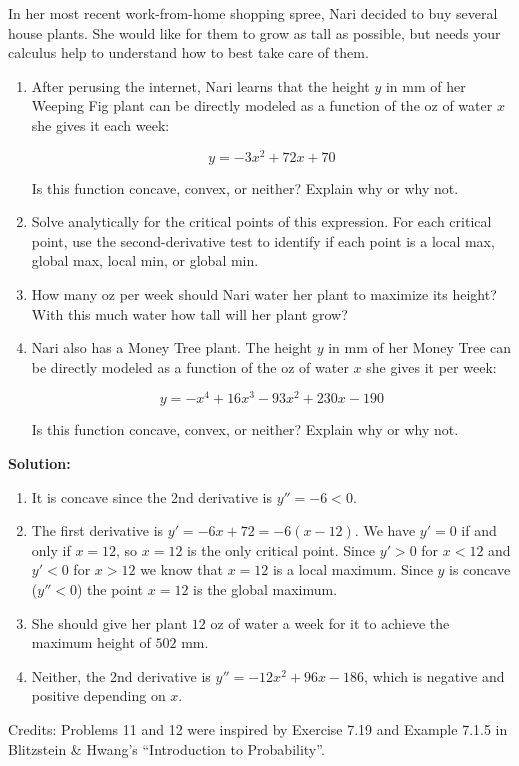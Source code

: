 \documentclass{harvardml}
\theoremstyle{definition}
\theoremstyle{plain}
\begin{document}
\begin{problem}

In her most recent work-from-home shopping spree, Nari decided to buy several house plants.  She would like for them to grow as tall as possible, but needs your calculus help to understand how to best take care of them.

\begin{enumerate} [label=(\alph*)] 
\item After perusing the internet, Nari learns that the height $y$ in mm of her Weeping Fig plant can be directly modeled as a function of the oz of water $x$ she gives it each week:



$$ y = - 3x^2 + 72x + 70$$

Is this function concave, convex, or neither?  Explain why or why not.

\item Solve analytically for the critical points of this expression.  For each critical point, use the second-derivative test to identify if each point is a local max, global max, local min, or global min. 

\item  How many oz per week should Nari water her plant to maximize its height? With this much water how tall will her plant grow?

\item Nari also has a Money Tree plant.  The height $y$ in mm of her Money Tree can be directly modeled as a function of the oz of water $x$ she gives it per week:

$$ y = - x^4 + 16 x^3 - 93 x^2 + 230 x - 190$$

Is this function concave, convex, or neither?  Explain why or why not.

\end{enumerate}

\noindent \textbf{Solution:}
\begin{enumerate}[label=(\alph*)]
    \item It is concave since the 2nd derivative is $y'' = -6 < 0$.
    \item The first derivative is $y' = -6x+72 = -6(x-12)$. We have $y' = 0$ if and only if $x = 12$, so $x=12$ is the only critical point. Since $y' > 0$ for $x < 12$ and $y' < 0$ for $x > 12$ we know that $x=12$ is a local maximum. Since $y$ is concave ($y'' < 0$) the point $x=12$ is the global maximum.
    \item She should give her plant $12$ oz of water a week for it to achieve the maximum height of $502$ mm.
    \item Neither, the 2nd derivative is $y'' = -12x^2 + 96x -186$, which is negative and positive depending on $x$.
\end{enumerate}


\end{problem}


\noindent Credits:  Problems 11 and 12 were inspired by Exercise 7.19 and  Example 7.1.5 in Blitzstein \& Hwang's ``Introduction to Probability''.
\end{document}
